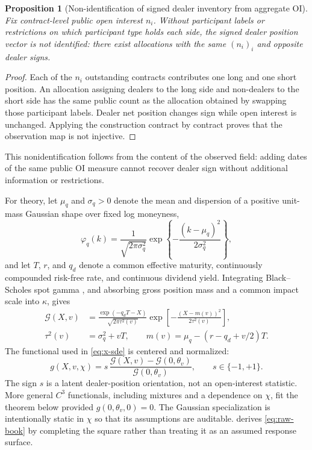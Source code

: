 \documentclass[11pt]{article}
\newtheorem{proposition}{Proposition}
\begin{document}
\begin{proposition}[Non-identification of signed dealer inventory from aggregate OI]
\label{prop:oi-nonid}
Fix contract-level public open interest $n_i$.  Without participant labels or restrictions on
which participant type holds each side, the signed dealer position vector is not identified:
there exist allocations with the same $(n_i)_i$ and opposite dealer signs.
\end{proposition}

\begin{proof}
Each of the $n_i$ outstanding contracts contributes one long and one short position.  An
allocation assigning dealers to the long side and non-dealers to the short side has the same
public count as the allocation obtained by swapping those participant labels.  Dealer net
position changes sign while open interest is unchanged.  Applying the construction contract
by contract proves that the observation map is not injective.
\end{proof}

This nonidentification follows from the content of the observed field: adding dates of the
same public OI measure cannot recover dealer sign without additional information or
restrictions.

For theory, let $\mu_q$ and $\sigma_q>0$ denote the mean and dispersion of a positive
unit-mass Gaussian shape over fixed log moneyness,
\[
\varphi_q(k)=\frac{1}{\sqrt{2\pi\sigma_q^2}}
\exp\left\{-\frac{(k-\mu_q)^2}{2\sigma_q^2}\right\},
\]
and let $T$, $r$, and $q_d$ denote a common effective maturity, continuously compounded
risk-free rate, and continuous dividend yield.  Integrating Black--Scholes spot gamma
\citep{blackscholes1973}, and absorbing gross position mass and a common impact scale into
$\kappa$, gives
\begin{align}
\mathcal G(X,v)
&=\frac{\exp(-q_dT-X)}{\sqrt{2\pi\tau^2(v)}}
\exp\!\left[-\frac{(X-m(v))^2}{2\tau^2(v)}\right], \label{eq:raw-book}\\
\tau^2(v)&=\sigma_q^2+vT,
\qquad
m(v)=\mu_q-(r-q_d+v/2)T. \nonumber
\end{align}
The functional used in \eqref{eq:x-sde} is centered and normalized:
\begin{equation}
g(X,v,\chi)=s\,
\frac{\mathcal G(X,v)-\mathcal G(0,\theta_v)}
     {\mathcal G(0,\theta_v)},
\qquad s\in\{-1,+1\}. \label{eq:centered-book}
\end{equation}
The sign $s$ is a latent dealer-position orientation, not an open-interest statistic.  More
general $C^3$ functionals, including mixtures and a dependence on $\chi$, fit the theorem
below provided $g(0,\theta_v,0)=0$.  The Gaussian specialization is intentionally static in
$\chi$ so that its assumptions are auditable.   derives
\eqref{eq:raw-book} by completing the square rather than treating it as an assumed response
surface.
\end{document}

